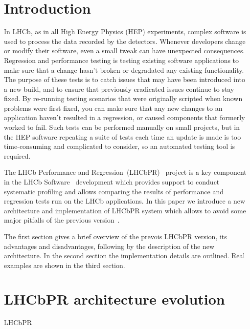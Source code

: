 \documentclass[a4paper]{jpconf}
\begin{document}
\section{Introduction}

In LHCb, as in all High Energy Physics (HEP) experiments, complex software is
used to process the data recorded by the detectors. Whenever developers change
or modify their software, even a small tweak can have unexpected
consequences. Regression and performance testing is testing existing software
applications to make sure that a change hasn't broken or degradated any existing
functionality. The purpose of these tests is to catch issues that may have been
introduced into a new build, and to ensure that previously eradicated issues
continue to stay fixed. By re-running testing scenarios that were originally
scripted when known problems were first fixed, you can make sure that any new
changes to an application haven't resulted in a regression, or caused components
that formerly worked to fail. Such tests can be performed manually on small
projects, but in the HEP software repeating a suite of tests each time an update
is made is too time-consuming and complicated to consider, so an automated
testing tool is required. 

The LHCb Performance and Regression~(LHCbPR)~\cite{lhcbpr}  project is a key
component in the LHCb Software~\cite{lhcbsoft} development which provides support to conduct
systematic profiling and allows comparing the results of performance
and regression tests run on the LHCb applications. In this paper we introduce
a new architecture and implementation of LHCbPR system which allows to avoid
some major pitfalls of the previous version~\cite{lhcbpr}.

The first section gives a brief overview of the prevois LHCbPR version,
its advantages and disadvantages, following by the description of the
new architecture. In the second section the implementation details are outlined.
Real examples are shown in the third section.

\section{LHCbPR architecture evolution}

LHCbPR 
\end{document}

